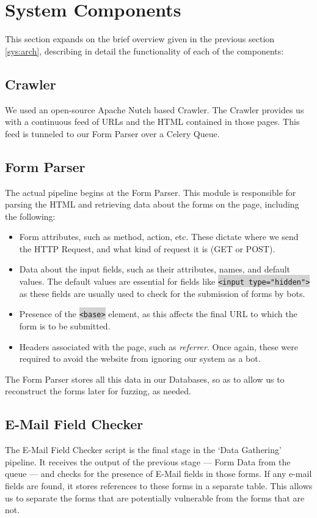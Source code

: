 \section{System Components}
\label{Comp}

This section expands on the brief overview given in the previous section \ref{sys:arch}, describing in detail the functionality of each of the components:

\subsection{Crawler}
\label{Comp:Crawler}
We used an open-source Apache Nutch based Crawler. The Crawler provides us with a continuous feed of URLs and the HTML contained in those pages. This feed is tunneled to our Form Parser over a Celery Queue.

\subsection{Form Parser}
\label{Comp:FP}
The actual pipeline begins at the Form Parser. This module is responsible for parsing the HTML and retrieving data about the forms on the page, including the following:
\begin{itemize}
	\item Form attributes, such as method, action, etc. These dictate where we send the HTTP Request, and what kind of request it is (GET or POST).
	\item Data about the input fields, such as their attributes, names, and default values. The default values are essential for fields like \colorbox{lightgray}{\lstinline{<input type="hidden">}} as these fields are usually used to check for the submission of forms by bots.
	\item Presence of the \colorbox{lightgray}{\lstinline{<base>}} element, as this affects the final URL to which the form is to be submitted.
	\item Headers associated with the page, such as \emph{referrer}. Once again, these were required to avoid the website from ignoring our system as a bot.
\end{itemize} 
The Form Parser stores all this data in our Databases, so as to allow us to reconstruct the forms later for fuzzing, as needed.

\subsection{E-Mail Field Checker}
\label{Comp:EMFC}
The E-Mail Field Checker script is the final stage in the `Data Gathering' pipeline. It receives the output of the previous stage --- Form Data from the queue --- and checks for the presence of E-Mail fields in those forms. If any e-mail fields are found, it stores references to these forms in a separate table. This allows us to separate the forms that are potentially vulnerable from the forms that are not.

